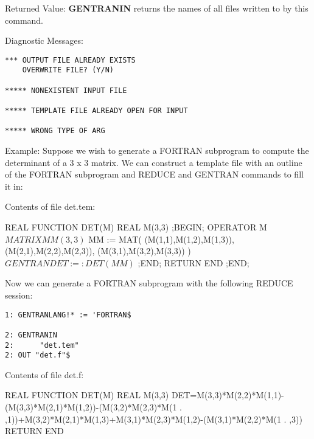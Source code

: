 \begin{describe}{Returned Value:}
{\bf GENTRANIN} returns the names of all files written to by this
command.
\end{describe}
\begin{describe}{Diagnostic Messages:}
\begin{verbatim}
*** OUTPUT FILE ALREADY EXISTS
    OVERWRITE FILE? (Y/N)

***** NONEXISTENT INPUT FILE

***** TEMPLATE FILE ALREADY OPEN FOR INPUT

***** WRONG TYPE OF ARG
\end{verbatim}
\end{describe}
\begin{describe}{Example:}
Suppose we wish to generate a FORTRAN subprogram to compute the
determinant of a 3 x 3 matrix.  We can construct a template
file with an outline of the FORTRAN subprogram and REDUCE and
GENTRAN commands to fill it in:

Contents of file det.tem:
\end{describe}
\begin{framedverbatim}
      REAL FUNCTION DET(M)                         
      REAL M(3,3)                                  
;BEGIN;                                              
      OPERATOR M$                                    
      MATRIX MM(3,3)$                                
      MM := MAT( (M(1,1),M(1,2),M(1,3)),             
                 (M(2,1),M(2,2),M(2,3)),             
                 (M(3,1),M(3,2),M(3,3)) )$           
      GENTRAN DET :=: DET(MM)$                       
;END;                                                
      RETURN                                         
      END                                            
;END;                                                
\end{framedverbatim}

\begin{describe}{}
Now we can generate a FORTRAN subprogram with the following
REDUCE session:
\begin{verbatim}
1: GENTRANLANG!* := 'FORTRAN$ 

2: GENTRANIN 
2:      "det.tem" 
2: OUT "det.f"$ 
\end{verbatim}
Contents of file det.f:
\end{describe}
\begin{framedverbatim}
      REAL FUNCTION DET(M)
      REAL M(3,3)
      DET=M(3,3)*M(2,2)*M(1,1)-(M(3,3)*M(2,1)*M(1,2))-(M(3,2)*M(2,3)*M(1
     . ,1))+M(3,2)*M(2,1)*M(1,3)+M(3,1)*M(2,3)*M(1,2)-(M(3,1)*M(2,2)*M(1
     . ,3))
      RETURN
      END
\end{framedverbatim}

